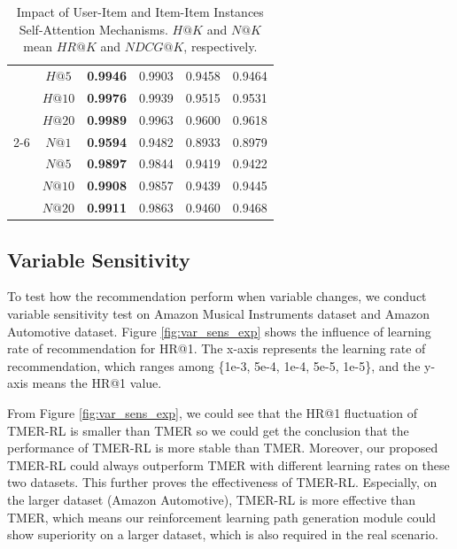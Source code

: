 \begin{table}[]
\begin{tabular}{c|c|c|c|c|c}
                                            & $H@5$    & \textbf{0.9946} & 0.9903 & 0.9458  & 0.9464  \\ 
                                            & $H@10$   & \textbf{0.9976} & 0.9939 & 0.9515  & 0.9531  \\ 
                                            & $H@20$   & \textbf{0.9989} & 0.9963 & 0.9600  & 0.9618  \\ 
                             \cline{2-6}                & $N@1$  & \textbf{0.9594} & 0.9482 & 0.8933  & 0.8979  \\ 
                                            & $N@5$  & \textbf{0.9897} & 0.9844 & 0.9419  & 0.9422  \\ 
                                            & $N@10$ & \textbf{0.9908} & 0.9857 & 0.9439  & 0.9445  \\ 
                                            & $N@20$ & \textbf{0.9911} & 0.9863 & 0.9460  & 0.9468  \\ \hline
\end{tabular} \caption{Impact of User-Item and Item-Item Instances Self-Attention Mechanisms. $H@K$ and $N@K$ mean $HR@K$ and $NDCG@K$, respectively.}\label{tab:abtest}
\end{table}

\subsection{Variable Sensitivity}
\label{subsec:var_sens}
To test how the recommendation perform when variable changes, we conduct variable sensitivity test on Amazon Musical Instruments dataset and Amazon Automotive dataset. Figure \ref{fig:var_sens_exp} shows the influence of learning rate of recommendation for HR@1. The x-axis represents the learning rate of recommendation, which ranges among \{1e-3, 5e-4, 1e-4, 5e-5, 1e-5\}, and the y-axis means the HR@1 value. 

From Figure \ref{fig:var_sens_exp}, we could see that the HR@1 fluctuation of TMER-RL is smaller than TMER so we could get the conclusion that the performance of TMER-RL is more stable than TMER. Moreover, our proposed TMER-RL could always outperform TMER with different learning rates on these two datasets. This further proves the effectiveness of TMER-RL. Especially, on the larger dataset (Amazon Automotive), TMER-RL is more effective than TMER, which means our reinforcement learning path generation module could show superiority on a larger dataset, which is also required in the real scenario.

